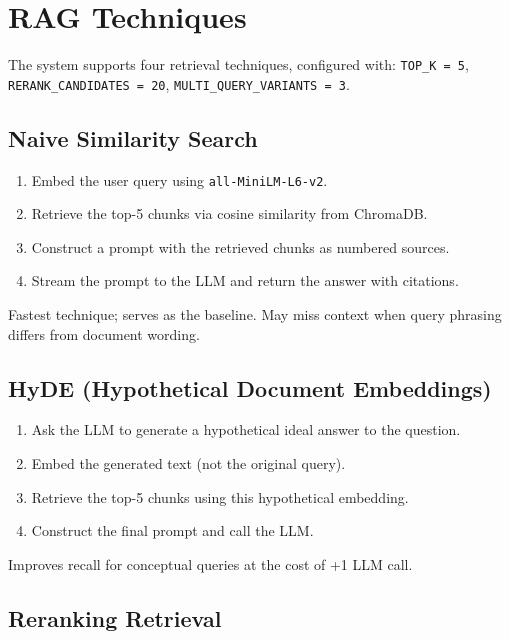 \documentclass[11pt, letterpaper]{article}
\begin{document}
\section{RAG Techniques}

The system supports four retrieval techniques, configured with:
\texttt{TOP\_K\,=\,5}, \texttt{RERANK\_CANDIDATES\,=\,20},
\texttt{MULTI\_QUERY\_VARIANTS\,=\,3}.

\subsection{Naive Similarity Search}

\begin{enumerate}
    \item Embed the user query using \texttt{all-MiniLM-L6-v2}.
    \item Retrieve the top-5 chunks via cosine similarity from ChromaDB.
    \item Construct a prompt with the retrieved chunks as numbered sources.
    \item Stream the prompt to the LLM and return the answer with citations.
\end{enumerate}

Fastest technique; serves as the baseline.  May miss context when query phrasing
differs from document wording.

\subsection{HyDE (Hypothetical Document Embeddings)}

\begin{enumerate}
    \item Ask the LLM to generate a hypothetical ideal answer to the question.
    \item Embed the generated text (not the original query).
    \item Retrieve the top-5 chunks using this hypothetical embedding.
    \item Construct the final prompt and call the LLM.
\end{enumerate}

Improves recall for conceptual queries at the cost of +1 LLM call.

\subsection{Reranking Retrieval}
\end{document}
